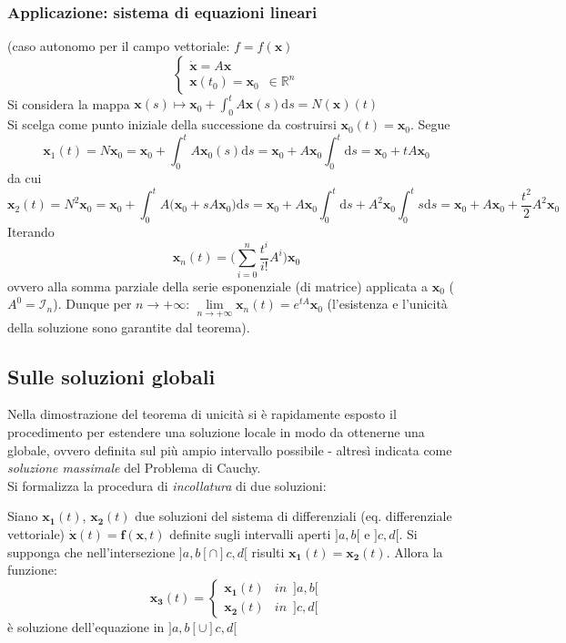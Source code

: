 \documentclass[10pt, oneside]{book}
\theoremstyle{plain}
\begin{document}
\subsubsection{Applicazione: sistema di equazioni lineari}
(caso autonomo per il campo vettoriale: $f = f(\mathbf{x})$
\[\begin{cases}
\dot{\mathbf{x}} = A \mathbf{x}\\
\mathbf{x}(t_0) = \mathbf{x}_0 \enspace \in \mathbb{R}^n
\end{cases}\]
Si considera la mappa $\displaystyle \mathbf{x}(s) \longmapsto \mathbf{x}_0 + \int_{0}^{t}A \mathbf{x}(s)\textrm{d}s = N(\mathbf{x})(t)$
\\Si scelga come punto iniziale della successione da costruirsi $\mathbf{x}_0(t) = \mathbf{x}_0$. Segue 
\[\mathbf{x}_1(t) = N \mathbf{x}_0 = \mathbf{x}_0 + \int_{0}^{t}A  \mathbf{x}_0(s)\textrm{d}s = \mathbf{x}_0 + A \mathbf{x}_0\int_{0}^{t}\textrm{d}s = \mathbf{x}_0 + t A \mathbf{x}_0\]
da cui
\[\mathbf{x}_2(t) = N^2 \mathbf{x}_0 = \mathbf{x}_0 + \int_{0}^{t}A \big(\mathbf{x}_0 + sA\mathbf{x}_0\big)\textrm{d}s = \mathbf{x}_0 + A \mathbf{x}_0\int_{0}^{t}\textrm{d}s + A^2\mathbf{x}_0\int_{0}^{t}s\textrm{d}s = \mathbf{x}_0 + A \mathbf{x}_0 + \frac{t^2}{2}A^2 \mathbf{x}_0\]
Iterando
\[\mathbf{x}_n(t) = \big(\sum\limits_{i=0}^n \frac{t^i}{i!}A^i\big)\mathbf{x}_0\]
ovvero alla somma parziale della serie esponenziale (di matrice) applicata a $\mathbf{x}_0$ ($A^0 = \mathcal{I}_n$). Dunque per $n \rightarrow +\infty$: $\lim\limits_{n \rightarrow +\infty} \mathbf{x}_n(t) = e^{tA}\mathbf{x}_0$ (l'esistenza e l'unicità della soluzione sono garantite dal teorema).

\subsection{Sulle soluzioni globali}
Nella dimostrazione del teorema di unicità si è rapidamente esposto il procedimento per estendere una soluzione locale in modo da ottenerne una globale, ovvero definita sul più ampio intervallo possibile - altresì indicata come \textit{soluzione massimale} del Problema di Cauchy.
\\Si formalizza la procedura di \textit{incollatura} di due soluzioni:
\begin{prop}
Siano $\mathbf{x_1}(t)$, $\mathbf{x_2}(t)$ due soluzioni del sistema di differenziali (eq. differenziale vettoriale) $\dot{\mathbf{x}}(t) = \mathbf{f}(\mathbf{x}, t)$ definite sugli intervalli aperti $]a,b[$ e $]c,d[$. Si supponga che nell'intersezione $]a,b[ \cap ]c,d[$ risulti $\mathbf{x_1}(t) = \mathbf{x_2}(t)$. Allora la funzione:
\[\mathbf{x_3}(t) = \begin{cases}
\mathbf{x_1}(t) & in \enspace ]a,b[\\
\mathbf{x_2}(t) & in \enspace ]c,d[
\end{cases}\]
è soluzione dell'equazione in $]a,b[ \cup ]c,d[$
\end{prop}
\end{document}
